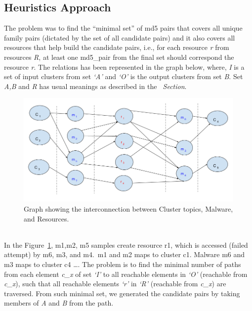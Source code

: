 \subsection{Heuristics Approach}
\label{sub:Heuristics Approach}
The problem was to find the ``minimal set'' of md5 pairs that covers all unique family pairs (dictated by the set of all candidate pairs) and it also covers all resources that help build the candidate pairs, i.e., for each resource \emph{r} from resources \emph{R}, at least one md5\_pair from the final set should correspond the resource \emph{r}.
The relations has been represented in the graph below, where, \emph{I} is a set of input clusters from set \emph{`A'} and \emph{`O'} is the output clusters from set \emph{B}. Set \emph{A,B} and \emph{R} has usual meanings as described in the\textit{~ Section}.
\begin{figure}[htbp]
  \centering
  \includegraphics[scale=0.45]{figures/dhkherusitcs.png}
  \caption[]{Graph showing the interconnection between Cluster topics, Malware, and Resources.}\label{fig:dhkheuristics}
\end{figure}
\\
In the Figure~\ref{fig:dhkheuristics},  m1,m2, m5 samples create resource r1, which is accessed (failed attempt) by m6, m3, and m4.\ m1 and m2 maps to cluster c1. Malware m6 and m3 maps to cluster c4 \dots.
The problem is to find the minimal number of paths from each element \emph{c\_x} of set \emph{`I'} to all reachable elements in \emph{`O'} (reachable from \emph{c\_x}), such that all reachable elements \emph{`r'} in \emph{`R'} (reachable from \emph{c\_x}) are traversed. From such minimal set, we generated the candidate pairs by taking members of \emph{A} and \emph{B} from the path.
